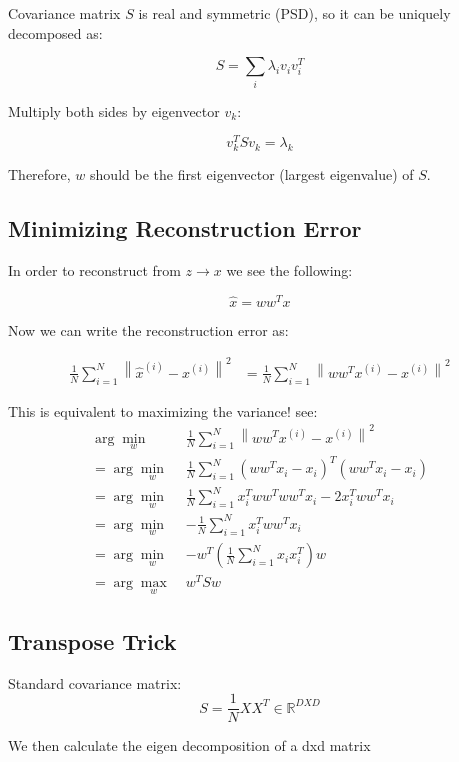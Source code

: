 \documentclass[11pt]{article}
\begin{document}
\medskip
Covariance matrix $S$ is real and symmetric (PSD), so it can be uniquely decomposed as:

\[
	S = \sum_i \lambda_i v_i v_i^T
\]

Multiply both sides by eigenvector $v_k$:

\[
	v_k^T S v_k = \lambda_k
\]

\bigskip

Therefore, $w$ should be the first eigenvector (largest eigenvalue) of $S$.


\subsection*{Minimizing Reconstruction Error}

In order to reconstruct from $z \rightarrow x$ we see the following:

\[
	\hat{x} = w w^T x
\]

Now we can write the reconstruction error as:

\begin{align}
	\frac{1}{N} \sum_{i=1}^{N} \left\| \hat{x}^{(i)} - x^{(i)} \right\|^2
	 & = \frac{1}{N} \sum_{i=1}^{N} \left\| ww^T x^{(i)} - x^{(i)} \right\|^2
\end{align}

This is equivalent to maximizing the variance! see:
\[
\begin{aligned}
\arg\min_{w} \;& \frac{1}{N} \sum_{i=1}^{N} \left\| ww^T x^{(i)} - x^{(i)} \right\|^2 \\
= \arg\min_{w} \;& \frac{1}{N} \sum_{i=1}^{N} (ww^T x_i - x_i)^T (ww^T x_i - x_i) \\
= \arg\min_{w} \;& \frac{1}{N} \sum_{i=1}^{N} x_i^T ww^T ww^T x_i - 2x_i^T ww^T x_i \\
= \arg\min_{w} \;& -\frac{1}{N} \sum_{i=1}^{N} x_i^T ww^T x_i \\
= \arg\min_{w} \;& - w^T \left( \frac{1}{N} \sum_{i=1}^{N} x_i x_i^T \right) w \\
= \arg\max_{w} \;& w^T S w
\end{aligned}
\]


\subsection*{Transpose Trick}

Standard covariance matrix:
\[
S = \frac{1}{N}XX^T \in \mathbb{R}^{DXD}
\]

We then calculate the eigen decomposition of a dxd matrix
\end{document}
